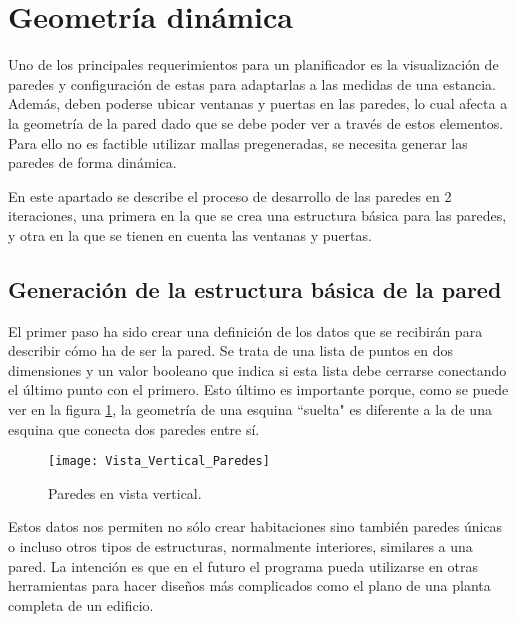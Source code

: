 \section{Geometría dinámica}
\label{walls_holes}
Uno de los principales requerimientos para un planificador es la visualización de paredes y configuración de estas para adaptarlas a las medidas de una estancia. Además, deben poderse ubicar ventanas y puertas en las paredes, lo cual afecta a la geometría de la pared dado que se debe poder ver a través de estos elementos. Para ello no es factible utilizar mallas pregeneradas, se necesita generar las paredes de forma dinámica.

En este apartado se describe el proceso de desarrollo de las paredes en 2 iteraciones, una primera en la que se crea una estructura básica para las paredes, y otra en la que se tienen en cuenta las ventanas y puertas.

\subsection{Generación de la estructura básica de la pared}
\label{subsec:gen1}
El primer paso ha sido crear una definición de los datos que se recibirán para describir cómo ha de ser la pared. Se trata de una lista de puntos en dos dimensiones y un valor booleano que indica si esta lista debe cerrarse conectando el último punto con el primero. Esto último es importante porque, como se puede ver en la figura \ref{fig:vertical_view_walls}, la geometría de una esquina ``suelta" es diferente a la de una esquina que conecta dos paredes entre sí.

\begin{figure}[h]
    \centering
    \texttt{[image: Vista\_Vertical\_Paredes]}
    \caption{Paredes en vista vertical.}
    \label{fig:vertical_view_walls}
\end{figure}

Estos datos nos permiten no sólo crear habitaciones sino también paredes únicas o incluso otros tipos de estructuras, normalmente interiores, similares a una pared. La intención es que en el futuro el programa pueda utilizarse en otras herramientas para hacer diseños más complicados como el plano de una planta completa de un edificio.

